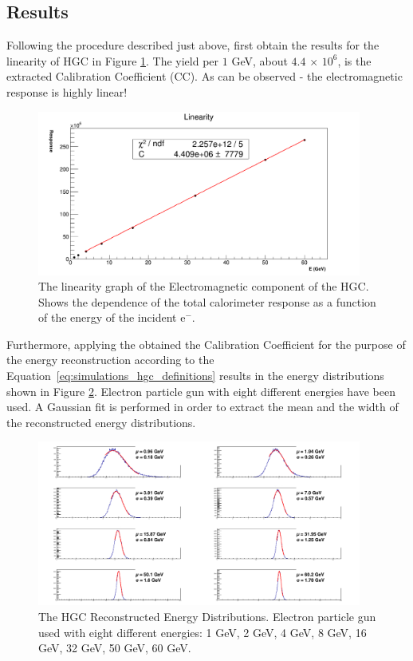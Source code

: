 \subsection{Results}
Following the procedure described just above, first obtain the results for the linearity of {\sc HGC} in Figure \ref{fig:simulations_hgc_pblinearity}. The yield per $1$ GeV, about $4.4$ $\times$ $10^6$, is the extracted Calibration Coefficient (CC). As can be observed - the electromagnetic response is highly linear!
 \begin{figure}[htbp]
    \centering
    \includegraphics[width=0.95\textwidth]{figures/ch_simulations/hgc/performance/Pb/Linearity.png}
    \caption{The linearity graph of the Electromagnetic component of the {\sc HGC}. Shows the dependence of the total calorimeter response as a function of the energy of the incident e$^-$.}
    \label{fig:simulations_hgc_pblinearity}
 \end{figure}

Furthermore, applying the obtained the Calibration Coefficient for the purpose of the energy reconstruction according to the Equation~\ref{eq:simulations_hgc_definitions} results in the energy distributions shown in Figure \ref{fig:simulations_hgc_pbenergyreco}. Electron particle gun with eight different energies have been used. A Gaussian fit is performed in order to extract the mean and the width of the reconstructed energy distributions.
\begin{figure}[htbp]
    \centering
    \includegraphics[width=0.95\textwidth]{figures/ch_simulations/hgc/performance/Pb/EnergyRECO.png}
    \caption{The {\sc HGC} Reconstructed Energy Distributions. Electron particle gun used with eight different energies: 1 GeV, 2 GeV, 4 GeV, 8 GeV, 16 GeV, 32 GeV, 50 GeV, 60 GeV.}
    \label{fig:simulations_hgc_pbenergyreco}
 \end{figure}

